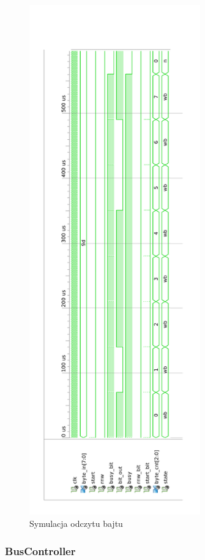 \documentclass[a4paper]{article}
\begin{document}
\begin{figure}[H]
\begin{center}
\includegraphics[height=22cm]{graphics/byte_module_symulation3.png}
\end{center}
\caption{Symulacja odczytu bajtu}
\label{byte_module_symulation3}
\end{figure}

\newpage

\subsubsection{BusController}
\end{document}
